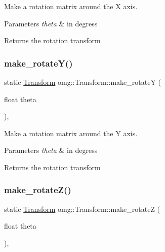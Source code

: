 Make a rotation matrix around the X axis. 


\begin{DoxyParams}{Parameters}
{\em theta} & in degress \\
\hline
\end{DoxyParams}
\begin{DoxyReturn}{Returns}
the rotation transform 
\end{DoxyReturn}
\mbox{\label{classomg_1_1_transform_a31915f4d8125beac27eb97f811583e8b}} 
\subsubsection{\texorpdfstring{make\_rotateY()}{make\_rotateY()}}
{\footnotesize\ttfamily static \mbox{\hyperlink{classomg_1_1_transform}{Transform}} omg\+::\+Transform\+::make\+\_\+rotateY (\begin{DoxyParamCaption}\item[{float}]{theta }\end{DoxyParamCaption})\hspace{0.3cm}{\ttfamily [inline]}, {\ttfamily [static]}}



Make a rotation matrix around the Y axis. 


\begin{DoxyParams}{Parameters}
{\em theta} & in degress \\
\hline
\end{DoxyParams}
\begin{DoxyReturn}{Returns}
the rotation transform 
\end{DoxyReturn}
\mbox{\label{classomg_1_1_transform_aca812cd5996e0e0711be1845c060797b}} 
\subsubsection{\texorpdfstring{make\_rotateZ()}{make\_rotateZ()}}
{\footnotesize\ttfamily static \mbox{\hyperlink{classomg_1_1_transform}{Transform}} omg\+::\+Transform\+::make\+\_\+rotateZ (\begin{DoxyParamCaption}\item[{float}]{theta }\end{DoxyParamCaption})\hspace{0.3cm}{\ttfamily [inline]}, {\ttfamily [static]}}



